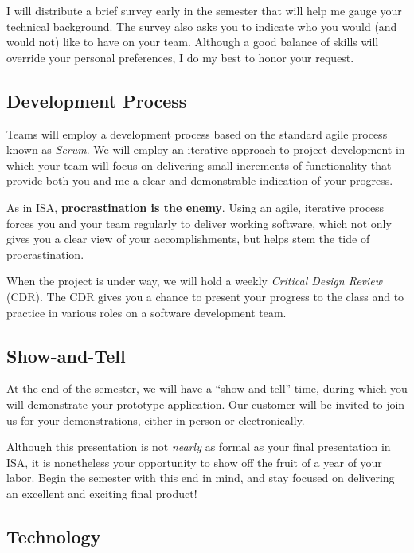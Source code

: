 \documentclass[11pt]{article}
\begin{document}
I will distribute a brief survey early in the semester
that will help me gauge your technical background.
The survey also asks you to indicate who you would (and would not) like
to have on your team.
Although a good balance of skills will override your personal preferences,
I do my best to honor your request.

\subsection{Development Process}

Teams will employ a development process
based on the standard agile process known as \emph{Scrum}.
We will employ an iterative approach to project development
in which your team will focus on delivering
small increments of functionality
that provide both you and me a clear and demonstrable indication of your progress.

As in ISA, \textbf{procrastination is the enemy}.
Using an agile, iterative process forces you and your team
regularly to deliver working software,
which not only gives you a clear view of your accomplishments,
but helps stem the tide of procrastination.

When the project is under way,
we will hold a weekly \emph{Critical Design Review} (CDR).
The CDR gives you a chance to present your progress to the class
and to practice in various roles on a software development team.

\subsection{Show-and-Tell}

At the end of the semester,
we will have a ``show and tell'' time,
during which you will demonstrate your prototype application.
Our customer will be invited to join us for your demonstrations,
either in person or electronically.

Although this presentation is not \emph{nearly} as formal
as your final presentation in ISA,
it is nonetheless your opportunity
to show off the fruit of a year of your labor.
Begin the semester with this end in mind,
and stay focused on delivering an excellent and exciting final product!

\subsection{Technology}
\end{document}
